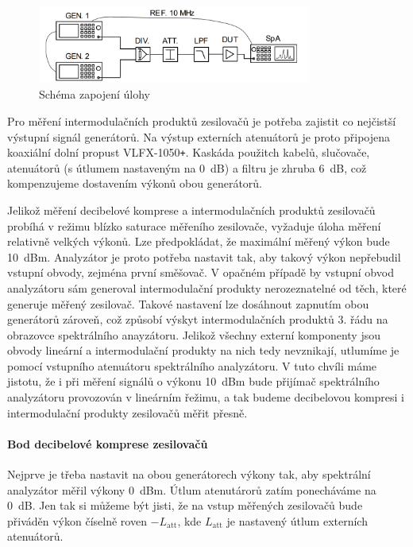\documentclass[11pt,a4paper]{article}
\newcommand{\plus}{{\texttt{+}}}
\begin{document}
\begin{figure}[!ht]
\begin{center}
    \includegraphics[width=0.8\textwidth]{src/connection-scheme.png}
\end{center}
\caption{Schéma zapojení úlohy}
\label{fig:connection-scheme}
\end{figure}

Pro měření intermodulačních produktů zesilovačů je potřeba zajistit co nejčistší výstupní signál generátorů. Na výstup externích atenuátorů je proto připojena koaxiální dolní propust VLFX-1050\plus. Kaskáda použitch kabelů, slučovače, atenuátorů (s útlumem nastaveným na 0~dB) a filtru je zhruba 6~dB, což kompenzujeme dostavením výkonů obou generátorů.

Jelikož měření decibelové komprese a intermodulačních produktů zesilovačů probíhá v režimu blízko saturace měřeního zesilovače, vyžaduje úloha měření relativně velkých výkonů. Lze předpokládat, že maximální měřený výkon bude 10~dBm. Analyzátor je proto potřeba nastavit tak, aby takový výkon nepřebudil vstupní obvody, zejména první směšovač. V opačném případě by vstupní obvod analyzátoru sám generoval intermodulační produkty nerozeznatelné od těch, které generuje měřený zesilovač. Takové nastavení lze dosáhnout zapnutím obou generátorů zároveň, což způsobí výskyt intermodulačních produktů 3. řádu na obrazovce spektrálního anayzátoru. Jelikož všechny externí komponenty jsou obvody lineární a intermodulační produkty na nich tedy nevznikají, utlumíme je pomocí vstupního atenuátoru spektrálního analyzátoru. V tuto chvíli máme jistotu, že i při měření signálů o výkonu 10~dBm bude přijímač spektrálního analyzátoru provozován v lineárním řežimu, a tak budeme decibelovou kompresi i intermodulační produkty zesilovačů měřit přesně.

\paragraph*{Bod decibelové komprese zesilovačů}
Nejprve je třeba nastavit na obou generátorech výkony tak, aby spektrální analyzátor měřil výkony 0~dBm. Útlum atenutárorů zatím ponecháváme na 0~dB. Jen tak si můžeme být jisti, že na vstup měřených zesilovačů bude přiváděn výkon číselně roven $-L_{\mathrm{att}}$, kde $L_{\mathrm{att}}$ je nastavený útlum externích atenuátorů.
\end{document}
